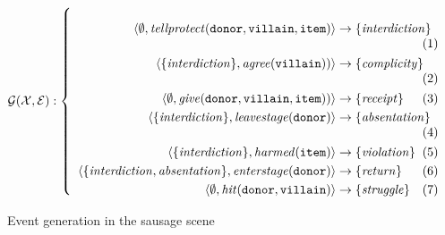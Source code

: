 \documentclass[11pt]{report}
\begin{document}
\begin{figure}[!t]
\abovedisplayskip=0pt
\abovedisplayshortskip=0pt
$\mathcal{G(X, E)}:\left\{\mbox{%
{\begin{minipage}[c]{0.85\textwidth}
\begin{align}
\langle \emptyset,\mathit{tellprotect}\mathtt{(donor, villain, item)} \rangle%
& \rightarrow \left\{\mathit{interdiction}\right\}\label{eq:gfirst}\\
                      \langle \{\mathit{interdiction}\}, \mathit{agree}\mathtt{(villain)}) \rangle %
& \rightarrow \left\{\mathit{complicity}\right\}\\
                      \langle \emptyset, \mathit{give}\mathtt{(donor, villain, item)}) \rangle %
& \rightarrow \left\{\mathit{receipt}\right\}\label{eq:receipt}\\
                      \langle \{\mathit{interdiction}\}, \mathit{leavestage}(\mathtt{donor}) \rangle %
& \rightarrow \left\{\mathit{absentation}\right\}\label{eq:absentation}\\
                      \langle \{\mathit{interdiction}\}, \mathit{harmed}(\mathtt{item}) \rangle %
& \rightarrow \left\{\mathit{violation}\right\}\\
                      \langle \{\mathit{interdiction, absentation}\},
                      \mathit{enterstage}(\mathtt{donor}) \rangle %
& \rightarrow \left\{\mathit{return}\right\}\\
                      \langle \emptyset, \mathit{hit}(\mathtt{donor, villain}) \rangle %
& \rightarrow \left\{\mathit{struggle}\right\}\label{eq:glast}
\end{align}
\end{minipage}}}\right.$
\caption{Event generation in the sausage scene} \label{fig:gen}
\end{figure}
\end{document}
